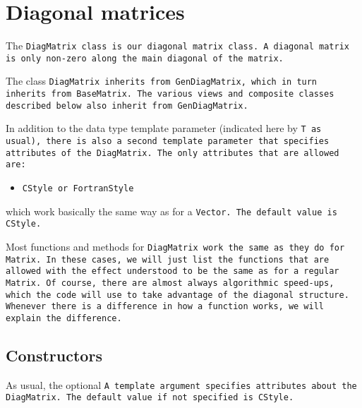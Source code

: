 
\section{Diagonal matrices}
\label{DiagMatrix}

The \tt{DiagMatrix} class is our diagonal matrix class.  
A diagonal matrix is only non-zero
along the main diagonal of the matrix.  

The class \tt{DiagMatrix} inherits from \tt{GenDiagMatrix},
which in turn inherits from \tt{BaseMatrix}.
The various views and composite classes described below
also inherit from \tt{GenDiagMatrix}.

In addition to the data type template parameter (indicated here by \tt{T} as usual),
there is also a second template parameter that specifies attributes of the
\tt{DiagMatrix}.  The only attributes that are allowed are:
\begin{itemize}
\item \tt{CStyle} or \tt{FortranStyle}
\end{itemize}
which work basically the same way as for a \tt{Vector}.
The default value is \tt{CStyle}.

Most functions and methods for \tt{DiagMatrix} work the same
as they do for \tt{Matrix}.
In these cases, we will just list the functions
that are allowed with the
effect understood to be the same as for a regular \tt{Matrix}.  Of course, there are 
almost always algorithmic speed-ups, which the code will use to take advantage of the 
diagonal structure.
Whenever there is a difference in how a function works,
we will explain the difference.

\subsection{Constructors}
\label{DiagMatrix_Constructors}

As usual, the optional \tt{A} template argument specifies attributes about
the \tt{DiagMatrix}.  The default value if not specified is \tt{CStyle}.

